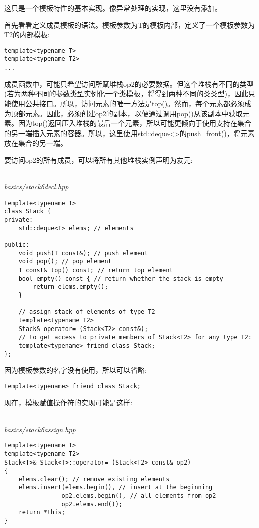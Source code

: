 \begin{tcolorbox}[colback=webgreen!5!white,colframe=webgreen!75!black]
\hspace*{0.75cm}这只是一个模板特性的基本实现。像异常处理的实现，这里没有添加。
\end{tcolorbox}

首先看看定义成员模板的语法。模板参数为T的模板内部，定义了一个模板参数为T2的内部模板:

\begin{lstlisting}[style=styleCXX]
template<typename T>
template<typename T2>
...
\end{lstlisting}

成员函数中，可能只希望访问所赋堆栈op2的必要数据。但这个堆栈有不同的类型(若为两种不同的参数类型实例化一个类模板，将得到两种不同的类类型)，因此只能使用公共接口。所以，访问元素的唯一方法是top()。然而，每个元素都必须成为顶部元素。因此，必须创建op2的副本，以便通过调用pop()从该副本中获取元素。因为top()返回压入堆栈的最后一个元素，所以可能更倾向于使用支持在集合的另一端插入元素的容器。所以，这里使用std::deque<>的push\_front()，将元素放在集合的另一端。

要访问op2的所有成员，可以将所有其他堆栈实例声明为友元:

\hspace*{\fill} \\ %
\noindent
\textit{basics/stack6decl.hpp}
\begin{lstlisting}[style=styleCXX]
template<typename T>
class Stack {
private:
	std::deque<T> elems; // elements
	
public:
	void push(T const&); // push element
	void pop(); // pop element
	T const& top() const; // return top element
	bool empty() const { // return whether the stack is empty
		return elems.empty();
	}

	// assign stack of elements of type T2
	template<typename T2>
	Stack& operator= (Stack<T2> const&);
	// to get access to private members of Stack<T2> for any type T2:
	template<typename> friend class Stack;
};
\end{lstlisting}

因为模板参数的名字没有使用，所以可以省略:

\begin{lstlisting}[style=styleCXX]
template<typename> friend class Stack;
\end{lstlisting}

现在，模板赋值操作符的实现可能是这样:

\hspace*{\fill} \\ %
\noindent
\textit{basics/stack6assign.hpp}
\begin{lstlisting}[style=styleCXX]
template<typename T>
template<typename T2>
Stack<T>& Stack<T>::operator= (Stack<T2> const& op2)
{
	elems.clear(); // remove existing elements
	elems.insert(elems.begin(), // insert at the beginning
				op2.elems.begin(), // all elements from op2
				op2.elems.end());
	return *this;
}
\end{lstlisting}

